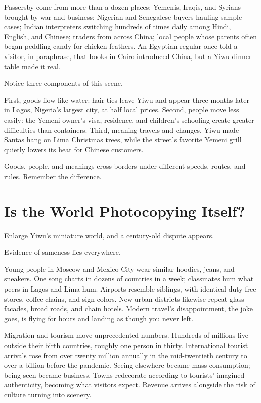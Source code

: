 Passersby come from more than a dozen places: Yemenis, Iraqis, and Syrians brought by war and business; Nigerian and Senegalese buyers hauling sample cases; Indian interpreters switching hundreds of times daily among Hindi, English, and Chinese; traders from across China; local people whose parents often began peddling candy for chicken feathers. An Egyptian regular once told a visitor, in paraphrase, that books in Cairo introduced China, but a Yiwu dinner table made it real.

Notice three components of this scene.

First, goods flow like water: hair ties leave Yiwu and appear three months later in Lagos, Nigeria's largest city, at half local prices. Second, people move less easily: the Yemeni owner's visa, residence, and children's schooling create greater difficulties than containers. Third, meaning travels and changes. Yiwu-made Santas hang on Lima Christmas trees, while the street's favorite Yemeni grill quietly lowers its heat for Chinese customers.

Goods, people, and meanings cross borders under different speeds, routes, and rules. Remember the difference.

\section{Is the World Photocopying Itself?}
Enlarge Yiwu's miniature world, and a century-old dispute appears.

Evidence of sameness lies everywhere.

Young people in Moscow and Mexico City wear similar hoodies, jeans, and sneakers. One song charts in dozens of countries in a week; classmates hum what peers in Lagos and Lima hum. Airports resemble siblings, with identical duty-free stores, coffee chains, and sign colors. New urban districts likewise repeat glass facades, broad roads, and chain hotels. Modern travel's disappointment, the joke goes, is flying for hours and landing as though you never left.

Migration and tourism move unprecedented numbers. Hundreds of millions live outside their birth countries, roughly one person in thirty. International tourist arrivals rose from over twenty million annually in the mid-twentieth century to over a billion before the pandemic. Seeing elsewhere became mass consumption; being seen became business. Towns redecorate according to tourists' imagined authenticity, becoming what visitors expect. Revenue arrives alongside the risk of culture turning into scenery.

